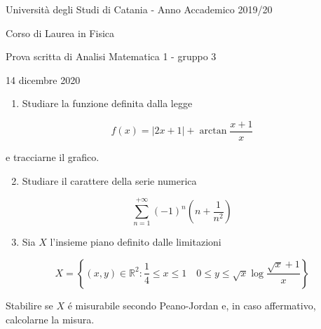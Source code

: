\documentclass[10pt]{article}
\begin{document}
Università degli Studi di Catania - Anno Accademico 2019/20

Corso di Laurea in Fisica

Prova scritta di Analisi Matematica 1 - gruppo 3

14 dicembre 2020

\begin{enumerate}
  \item Studiare la funzione definita dalla legge
\end{enumerate}

\[
f(x)=|2 x+1|+\arctan \frac{x+1}{x}
\]

e tracciarne il grafico.

\begin{enumerate}
  \setcounter{enumi}{1}
  \item Studiare il carattere della serie numerica
\end{enumerate}

\[
\sum_{n=1}^{+\infty}(-1)^{n}\left(n+\frac{1}{n^{2}}\right)
\]

\begin{enumerate}
  \setcounter{enumi}{2}
  \item Sia \(X\) l'insieme piano definito dalle limitazioni
\end{enumerate}

\[
X=\left\{(x, y) \in \mathbb{R}^{2}: \frac{1}{4} \leq x \leq 1 \quad 0 \leq y \leq \sqrt{x} \log \frac{\sqrt{x}+1}{x}\right\}
\]

Stabilire se \(X\) é misurabile secondo Peano-Jordan e, in caso affermativo, calcolarne la misura.
\end{document}
